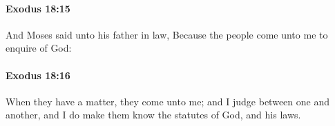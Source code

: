 		\paragraph{Exodus 18:15} %
			\label{EXODUS-18-15}

			And Moses said unto his father in law, Because the people come unto me to enquire of God:


		\paragraph{Exodus 18:16} %
			\label{EXODUS-18-16}

			When they have a matter, they come unto me; and I judge between one and another, and I do make them know the statutes of God, and his laws.


